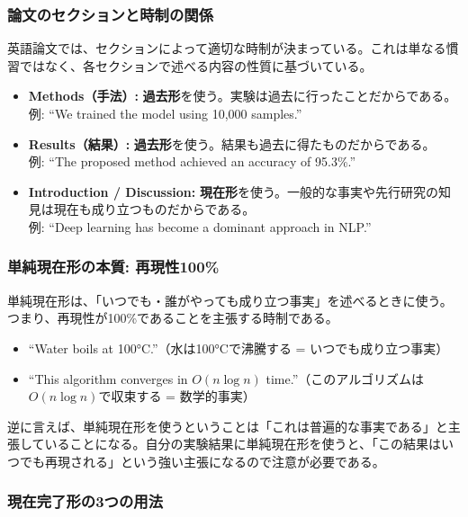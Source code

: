 \subsubsection{論文のセクションと時制の関係}

英語論文では、セクションによって適切な時制が決まっている。これは単なる慣習ではなく、各セクションで述べる内容の性質に基づいている。

\begin{itemize}
\item \textbf{Methods（手法）:} \textbf{過去形}を使う。実験は過去に行ったことだからである。\\
例: ``We trained the model using 10,000 samples.''
\item \textbf{Results（結果）:} \textbf{過去形}を使う。結果も過去に得たものだからである。\\
例: ``The proposed method achieved an accuracy of 95.3\%.''
\item \textbf{Introduction / Discussion:} \textbf{現在形}を使う。一般的な事実や先行研究の知見は現在も成り立つものだからである。\\
例: ``Deep learning has become a dominant approach in NLP.''
\end{itemize}

\subsubsection{単純現在形の本質: 再現性100\%}

単純現在形は、「いつでも・誰がやっても成り立つ事実」を述べるときに使う。つまり、再現性が100\%であることを主張する時制である。

\begin{itemize}
\item ``Water boils at 100°C.''（水は100°Cで沸騰する = いつでも成り立つ事実）
\item ``This algorithm converges in $O(n \log n)$ time.''（このアルゴリズムは$O(n \log n)$で収束する = 数学的事実）
\end{itemize}

逆に言えば、単純現在形を使うということは「これは普遍的な事実である」と主張していることになる。自分の実験結果に単純現在形を使うと、「この結果はいつでも再現される」という強い主張になるので注意が必要である。

\subsubsection{現在完了形の3つの用法}

